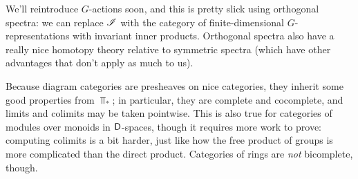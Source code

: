 We'll reintroduce $G$-actions soon, and this is pretty slick using orthogonal spectra: we can replace $\mathscr I$ with
the category of finite-dimensional $G$-representations with invariant inner products. Orthogonal spectra also have
a really nice homotopy theory relative to symmetric spectra (which have other advantages that don't apply as much
to us).

Because diagram categories are presheaves on nice categories, they inherit some good properties from $\Top_*$; in
particular, they are complete and cocomplete, and limits and colimits may be taken pointwise. This is also true for
categories of modules over monoids in $\mathsf D$-spaces, though it requires more work to prove: computing colimits is a
bit harder, just like how the free product of groups is more complicated than the direct product. Categories of
rings are \emph{not} bicomplete, though.

